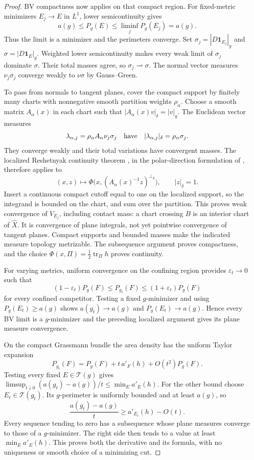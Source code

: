 \begin{proof}
BV compactness now applies on that compact region. For fixed-metric
minimizers $E_j\to E$ in $L^1$, lower semicontinuity gives
\[
 a(g)\le P_g(E)\le\liminf_jP_g(E_j)=a(g).
\]
Thus the limit is a minimizer and the perimeters converge. Set
$\sigma_j=|D\mathbf1_{E_j}|_g$ and $\sigma=|D\mathbf1_E|_g$.
Weighted lower semicontinuity makes every weak limit of $\sigma_j$
dominate $\sigma$. Their total masses agree, so
$\sigma_j\rightharpoonup\sigma$. The normal vector measures
$\nu_j\sigma_j$ converge weakly to $\nu\sigma$ by Gauss--Green.

To pass from normals to tangent planes, cover the compact support by
finitely many charts with nonnegative smooth partition weights
$\rho_\alpha$. Choose a smooth matrix $A_\alpha(x)$ in each chart
such that $|A_\alpha(x)v|_\delta=|v|_g$. The Euclidean vector measures
\[
 \lambda_{\alpha,j}=\rho_\alpha A_\alpha\nu_j\sigma_j
 \quad\hbox{have}\quad
 |\lambda_{\alpha,j}|_\delta=\rho_\alpha\sigma_j.
\]
They converge weakly and their total variations have convergent
masses. The localized Reshetnyak continuity theorem
\cite{Reshetnyak1968}, in the polar-direction formulation of
\cite[Theorem~1.3]{Spector2011}, therefore applies to
\[
 (x,z)\longmapsto
 \Phi\bigl(x,(A_\alpha(x)^{-1}z)^{\perp_g}\bigr),
 \qquad |z|_\delta=1.
\]
Insert a continuous compact cutoff equal to one on the localized
support, so the integrand is bounded on the chart, and sum over the
partition. This proves weak convergence of $V_{E_j}$, including
contact mass: a chart crossing $B$ is an interior chart of
$\widehat X$. It is convergence of plane integrals, not yet pointwise
convergence of tangent planes. Compact supports and bounded masses
make the indicated measure topology metrizable. The subsequence
argument proves compactness, and the choice
$\Phi(x,\Pi)=\frac12\operatorname{tr}_\Pi h$ proves continuity.

For varying metrics, uniform convergence on the confining region
provides $\varepsilon_t\to0$ such that
\[
 (1-\varepsilon_t)P_g(F)\le P_{g_t}(F)
              \le(1+\varepsilon_t)P_g(F)
\]
for every confined competitor. Testing a fixed $g$-minimizer and
using $P_g(E_t)\ge a(g)$ shows
$a(g_t)\to a(g)$ and $P_g(E_t)\to a(g)$. Hence every BV limit is a
$g$-minimizer and the preceding localized argument gives its plane
measure convergence.

On the compact Grassmann bundle the area density has the uniform
Taylor expansion
\begin{equation}\label{q:geometry:area-taylor}
 P_{g_t}(F)=P_g(F)+t\,a'_F(h)+O(t^2)P_g(F).
\end{equation}
Testing every fixed $E\in\mathcal T(g)$ gives
$\limsup_{t\downarrow0}(a(g_t)-a(g))/t\le\min_Ea'_E(h)$.
For the other bound choose $E_t\in\mathcal T(g_t)$. Its $g$-perimeter
is uniformly bounded and at least $a(g)$, so
\[
 \frac{a(g_t)-a(g)}t\ge a'_{E_t}(h)-O(t).
\]
Every sequence tending to zero has a subsequence whose plane measures
converge to those of a $g$-minimizer. The right side then tends to a
value at least $\min_Ea'_E(h)$. This proves both the derivative and
its formula, with no uniqueness or smooth choice of a minimizing cut.
\end{proof}

